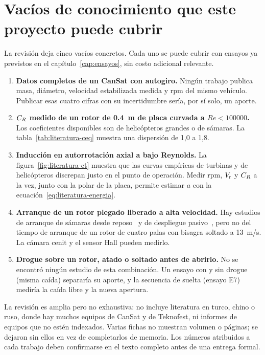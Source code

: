 \section{Vacíos de conocimiento que este proyecto puede cubrir}\label{sec:literatura-vacios}
La revisión deja cinco vacíos concretos. Cada uno se puede cubrir con ensayos ya
previstos en el capítulo~\ref{cap:ensayos}, sin costo adicional relevante.

\begin{enumerate}
  \item \textbf{Datos completos de un CanSat con autogiro.} Ningún trabajo publica masa,
        diámetro, velocidad estabilizada medida y rpm del mismo vehículo. Publicar esas
        cuatro cifras con su incertidumbre sería, por sí solo, un aporte.
  \item \textbf{$C_{R}$ medido de un rotor de \SI{0.4}{m} de placa curvada a
        $Re<\num{100000}$.} Los coeficientes disponibles son de helicópteros grandes o de
        sámaras. La tabla~\ref{tab:literatura-ceq} muestra una dispersión de 1,0 a 1,8.
  \item \textbf{Inducción en autorrotación axial a bajo Reynolds.} La
        figura~\ref{fig:literatura-ct} muestra que las curvas empíricas de turbinas y de
        helicópteros discrepan justo en el punto de operación. Medir rpm, $V_{\mathrm{r}}$ y $C_{R}$ a la
        vez, junto con la polar de la placa, permite estimar $a$ con la
        ecuación~\eqref{eq:literatura-energia}.
  \item \textbf{Arranque de un rotor plegado liberado a alta velocidad.} Hay estudios de
        arranque de sámaras desde reposo~\cite{literatura-varshney2012} y de despliegue
        pasivo~\cite{literatura-jain2022}, pero no del tiempo de arranque de un rotor
        de cuatro palas con bisagra soltado a \SI{13}{m/s}. La cámara cenit y el sensor
        Hall pueden medirlo.
  \item \textbf{Drogue sobre un rotor, atado o soltado antes de abrirlo.} No se encontró ningún estudio de esta
        combinación. Un ensayo con y sin drogue (misma caída) separaría su aporte, y la secuencia de suelta (ensayo E7) mediría la caída libre y la nueva apertura.
\end{enumerate}

\begin{nota}
La revisión es amplia pero no exhaustiva: no incluye literatura en turco, chino o ruso,
donde hay muchos equipos de CanSat y de Teknofest, ni informes de equipos que no estén
indexados. Varias fichas no muestran volumen o páginas; se dejaron sin ellos en vez de
completarlos de memoria. Los números atribuidos a cada trabajo deben confirmarse en el
texto completo antes de una entrega formal.
\end{nota}
